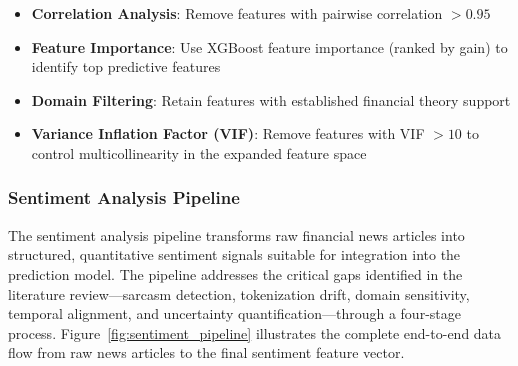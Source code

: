 \documentclass[12pt,a4paper]{article}
\begin{document}
\begin{itemize}
    \item \textbf{Correlation Analysis}: Remove features with pairwise correlation $> 0.95$
    \item \textbf{Feature Importance}: Use XGBoost feature importance (ranked by gain) to identify top predictive features
    \item \textbf{Domain Filtering}: Retain features with established financial theory support
    \item \textbf{Variance Inflation Factor (VIF)}: Remove features with VIF $> 10$ to control multicollinearity in the expanded feature space
\end{itemize}

\subsubsection{Sentiment Analysis Pipeline}
\label{sec:sentiment_pipeline}

The sentiment analysis pipeline transforms raw financial news articles into structured, quantitative sentiment signals suitable for integration into the prediction model. The pipeline addresses the critical gaps identified in the literature review---sarcasm detection, tokenization drift, domain sensitivity, temporal alignment, and uncertainty quantification---through a four-stage process. Figure~\ref{fig:sentiment_pipeline} illustrates the complete end-to-end data flow from raw news articles to the final sentiment feature vector.
\end{document}
